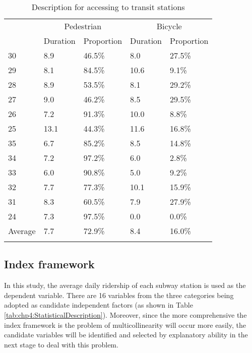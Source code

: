 \begin{table}[htbp]
	\centering
	\caption{Description for accessing to transit stations}
	\label{tab:chp4:AccessToStations}%
	\small
	\renewcommand{\arraystretch}{1.25} %
	
	\begin{tabular}{p{3em}<{\centering}p{5em}<{\raggedleft}p{5em}<{\raggedleft}p{5em}<{\raggedleft}p{5em}<{\raggedleft}}
	
		\Xhline{1.5pt}
		\multirow{2}{3em}{\centering{Station No.}} & \multicolumn{2}{c}{Pedestrian} & \multicolumn{2}{c}{Bicycle} \\
		& Duration & Proportion & Duration & Proportion \\
		
		\midrule
		30 & 8.9 & 46.5\% & 8.0 & 27.5\% \\
		29 & 8.1 & 84.5\% & 10.6 & 9.1\% \\
		28 & 8.9 & 53.5\% & 8.1 & 29.2\%\\
		27 & 9.0 & 46.2\% & 8.5 & 29.5\% \\
		26 & 7.2 & 91.3\% & 10.0 & 8.8\% \\
		25 & 13.1 & 44.3\% & 11.6 & 16.8\% \\
		35 & 6.7 & 85.2\% & 8.5 & 14.8\% \\
		34 & 7.2 & 97.2\% & 6.0 & 2.8\% \\
		33 & 6.0 & 90.8\% & 5.0 & 9.2\% \\
		32 & 7.7 & 77.3\% & 10.1 & 15.9\% \\
		31 & 8.3 & 60.5\% & 7.9 & 27.9\% \\
		24 & 7.3 & 97.5\% & 0.0 & 0.0\% \\
		
		\rowcolor[rgb]{.8, .8, .8}
		Average & 7.7 & 72.9\% & 8.4 & 16.0\% \\
		
		\Xhline{1.5pt}
	\end{tabular}%

\end{table}%

%
\subsection{Index framework}
%
In this study, the average daily ridership of each subway station is used as the dependent variable. There are 16 variables from the three categories being adopted as candidate independent factors (as shown in Table \ref{tab:chp4:StatisticalDescription}). Moreover, since the more comprehensive the index framework is the problem of multicollinearity will occur more easily, the candidate variables will be identified and selected by explanatory ability in the next stage to deal with this problem.

